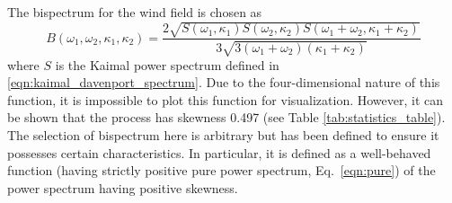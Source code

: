 \documentclass[preprint, review, 12pt]{elsarticle}
\begin{document}
The bispectrum for the wind field is chosen as
\begin{equation}
    B(\omega_1, \omega_2, \kappa_1, \kappa_2) = \frac{2\sqrt{S(\omega_1, \kappa_1) S(\omega_2, \kappa_2)S(\omega_1 + \omega_2, \kappa_1 + \kappa_2)}}{3\sqrt{3(\omega_1 + \omega_2)(\kappa_1 + \kappa_2)}}
    \label{eqn:bispectrum}
\end{equation}
where $S$ is the Kaimal power spectrum defined in \ref{eqn:kaimal_davenport_spectrum}. Due to the four-dimensional nature of this function, it is impossible to plot this function for visualization. However, it can be shown that the process has skewness 0.497 (see Table \ref{tab:statistics_table}). The selection of bispectrum here is arbitrary but has been defined to ensure it possesses certain characteristics. In particular, it is defined as a well-behaved function (having strictly positive pure power spectrum, Eq.\ \eqref{eqn:pure}) of the power spectrum having positive skewness.  


\end{document}
